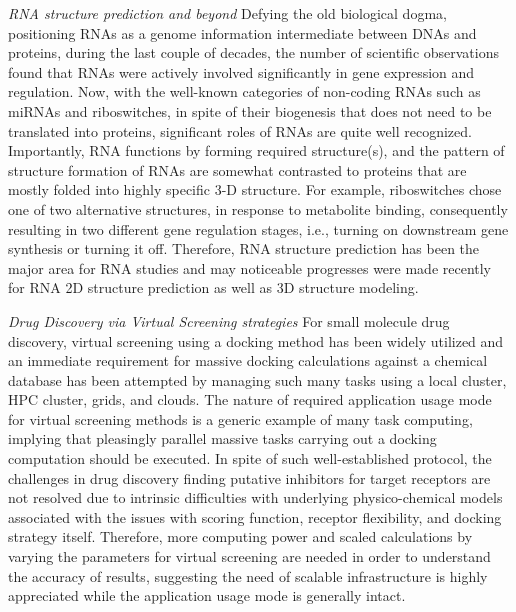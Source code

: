\documentclass{sig-alternate}
\begin{document}
\textit{RNA structure prediction and beyond}
Defying the old biological dogma, positioning RNAs as a genome information intermediate between DNAs and proteins, during the last couple of decades, the number of scientific observations found that RNAs were actively involved significantly in gene expression and regulation\cite{joyce1999,cruz2009,encode2007,amaral2008}.  Now, with the well-known categories of non-coding RNAs such as miRNAs and riboswitches, in spite of their biogenesis that does not need to be translated into proteins, significant roles of RNAs are quite well recognized\cite{costa2009,ellington2007,baek2008,blouin2009,henkin2009}.  Importantly, RNA functions by forming required structure(s), and the pattern of structure formation of RNAs are somewhat contrasted to proteins that are mostly folded into highly specific 3-D structure\cite{roth2009}. For example, riboswitches chose one of two alternative structures, in response to metabolite binding, consequently resulting in two different gene regulation stages, i.e., turning on downstream gene synthesis or turning it off\cite{montange2008,dambach2009,weinberg2007}.  Therefore, RNA structure prediction has been the major area for RNA studies and may noticeable progresses were made recently for RNA 2D structure prediction as well as 3D structure modeling\cite{shapiro2007,mathews2006,ding2003}.   

\textit{Drug Discovery via Virtual Screening strategies}
For small molecule drug discovery, virtual screening using a docking method has been widely utilized and an immediate requirement for massive docking calculations against a chemical database has been attempted by managing such many tasks using a local cluster, HPC cluster, grids, and clouds\cite{levesque2009,yim2010}.  The nature of required application usage mode for virtual screening methods is a generic example of many task computing, implying that pleasingly parallel massive tasks carrying out a docking computation should be executed.  In spite of such well-established protocol, the challenges in drug discovery finding putative inhibitors for target receptors are not resolved due to intrinsic difficulties with underlying physico-chemical models associated with the issues with scoring function, receptor flexibility, and docking strategy itself\cite{amaro2010}.  Therefore, more computing power and scaled calculations by varying the parameters for virtual screening are needed in order to understand the accuracy of results, suggesting the need of scalable infrastructure is highly appreciated while the application usage mode is generally intact.   
\end{document}

